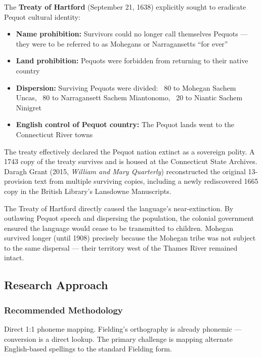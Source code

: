 The \textbf{Treaty of Hartford} (September 21, 1638) explicitly sought to
eradicate Pequot cultural identity:
\begin{itemize}
  \item \textbf{Name prohibition:} Survivors could no longer call themselves
    Pequots --- they were to be referred to as Mohegans or Narragansetts
    ``for ever''
  \item \textbf{Land prohibition:} Pequots were forbidden from returning to
    their native country
  \item \textbf{Dispersion:} Surviving Pequots were divided: ~80 to Mohegan
    Sachem Uncas, ~80 to Narragansett Sachem Miantonomo, ~20 to Niantic
    Sachem Ninigret
  \item \textbf{English control of Pequot country:} The Pequot lands went to
    the Connecticut River towns
\end{itemize}

The treaty effectively declared the Pequot nation extinct as a sovereign
polity. A 1743 copy of the treaty survives and is housed at the Connecticut
State Archives. Daragh Grant (2015, \emph{William and Mary Quarterly})
reconstructed the original 13-provision text from multiple surviving copies,
including a newly rediscovered 1665 copy in the British Library's Lansdowne
Manuscripts.

The Treaty of Hartford directly caused the language's near-extinction. By
outlawing Pequot speech and dispersing the population, the colonial government
ensured the language would cease to be transmitted to children. Mohegan
survived longer (until 1908) precisely because the Mohegan tribe was not
subject to the same dispersal --- their territory west of the Thames River
remained intact.

\subsection{Research Approach}

\subsubsection{Recommended Methodology}

Direct 1:1 phoneme mapping. Fielding's orthography is already phonemic ---
conversion is a direct lookup. The primary challenge is mapping alternate
English-based spellings to the standard Fielding form.

